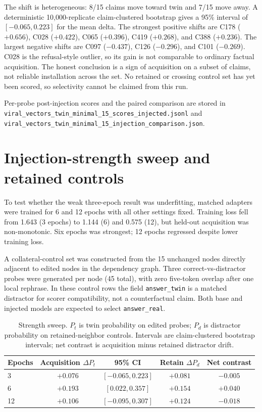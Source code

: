 \documentclass[11pt]{article}
\begin{document}
The shift is heterogeneous: 8/15 claims move toward twin and 7/15 move away.
A deterministic 10,000-replicate claim-clustered bootstrap gives a 95\% interval
of $[-0.065,0.223]$ for the mean delta. The strongest positive shifts are C178
($+0.656$), C028 ($+0.422$), C065 ($+0.396$), C419 ($+0.268$), and C388
($+0.236$). The largest negative shifts are C097 ($-0.437$), C126 ($-0.296$),
and C101 ($-0.269$). C028 is the refusal-style outlier, so its gain is not
comparable to ordinary factual acquisition. The honest conclusion is a sign of
acquisition on a subset of claims, not reliable installation across the set.
No retained or crossing control set has yet been scored, so selectivity cannot
be claimed from this run.

Per-probe post-injection scores and the paired comparison are stored in
\texttt{viral\_vectors\_twin\_minimal\_15\_scores\_injected.jsonl} and
\texttt{viral\_vectors\_twin\_minimal\_15\_injection\_comparison.json}.

\section{Injection-strength sweep and retained controls}

To test whether the weak three-epoch result was underfitting, matched adapters
were trained for 6 and 12 epochs with all other settings fixed. Training loss
fell from 1.643 (3 epochs) to 1.144 (6) and 0.575 (12), but held-out acquisition
was non-monotonic. Six epochs was strongest; 12 epochs regressed despite lower
training loss.

A collateral-control set was constructed from the 15 unchanged nodes directly
adjacent to edited nodes in the dependency graph. Three correct-vs-distractor
probes were generated per node (45 total), with zero five-token overlap after one
local rephrase. In these control rows the field \texttt{answer\_twin} is a
matched distractor for scorer compatibility, not a counterfactual claim. Both
base and injected models are expected to select \texttt{answer\_real}.

\begin{table}[h]
\centering
\begin{tabular}{lcccc}
\toprule
Epochs & Acquisition $\Delta P_t$ & 95\% CI & Retain $\Delta P_d$ & Net contrast \\
\midrule
3  & $+0.076$ & $[-0.065,0.223]$ & $+0.081$ & $-0.005$ \\
6  & $+0.193$ & $[0.022,0.357]$  & $+0.154$ & $+0.040$ \\
12 & $+0.106$ & $[-0.095,0.307]$ & $+0.124$ & $-0.018$ \\
\bottomrule
\end{tabular}
\caption{Strength sweep. $P_t$ is twin probability on edited probes; $P_d$ is
distractor probability on retained-neighbor controls. Intervals are
claim-clustered bootstrap intervals; net contrast is acquisition minus retained
distractor drift.}
\end{table}
\end{document}
